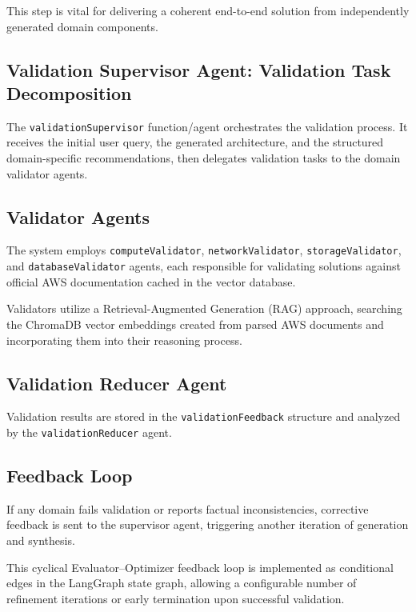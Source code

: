 This step is vital for delivering a coherent end-to-end solution from independently generated domain components.

\subsection{Validation Supervisor Agent: Validation Task Decomposition}

The \texttt{validationSupervisor} function/agent orchestrates the validation process. It receives the initial user query, the generated architecture, and the structured domain-specific recommendations, then delegates validation tasks to the domain validator agents.

\subsection{Validator Agents}

The system employs \texttt{computeValidator}, \texttt{networkValidator}, \texttt{storageValidator}, and \texttt{databaseValidator} agents, each responsible for validating solutions against official AWS documentation cached in the vector database.

Validators utilize a Retrieval-Augmented Generation (RAG) approach, searching the ChromaDB vector embeddings created from parsed AWS documents and incorporating them into their reasoning process.

\subsection{Validation Reducer Agent}

Validation results are stored in the \texttt{validationFeedback} structure and analyzed by the \texttt{validationReducer} agent.

\subsection{Feedback Loop}

If any domain fails validation or reports factual inconsistencies, corrective feedback is sent to the supervisor agent, triggering another iteration of generation and synthesis.

This cyclical Evaluator–Optimizer feedback loop \cite{anthropic2024agents} is implemented as conditional edges in the LangGraph state graph, allowing a configurable number of refinement iterations or early termination upon successful validation.

